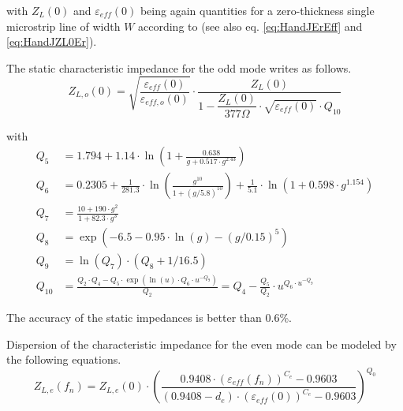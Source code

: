 \documentclass[10pt]{report}
\begin{document}
with $Z_L(0)$ and $\varepsilon_{eff}(0)$ being again quantities for a
zero-thickness single microstrip line of width $W$ according to
\cite{Hammerstad} (see also eq. \eqref{eq:HandJErEff} and
\eqref{eq:HandJZL0Er}).

\addvspace{12pt}

The static characteristic impedance for the odd mode writes as follows.
\begin{equation}
Z_{L,o}(0) = \sqrt{\dfrac{\varepsilon_{eff}(0)}{\varepsilon_{eff,o}(0)}} \cdot
             \dfrac{Z_L(0)}{1 - \dfrac{Z_L(0)}{377\Omega} \cdot \sqrt{\varepsilon_{eff}(0)} \cdot Q_{10}}
\end{equation}

with
\begin{align}
Q_5 &= 1.794 +1.14\cdot\ln\left( 1 + \frac{0.638}{g+0.517\cdot g^{2.43}} \right)\\
Q_6 &= 0.2305 + \frac{1}{281.3}\cdot \ln\left( \frac{g^{10}}{1+\left( g/5.8\right) ^{10}} \right)
     + \frac{1}{5.1}\cdot \ln\left(1+0.598\cdot g^{1.154}\right)\\
Q_7 &= \frac{10+190\cdot g^2}{1+82.3\cdot g^3}\\
Q_8 &= \exp\left( -6.5 - 0.95\cdot\ln\left(g\right) - \left(g/0.15\right)^5 \right)\\
Q_9 &= \ln\left(Q_7\right)\cdot \left( Q_8 + 1/16.5 \right)\\
Q_{10} &= \frac{Q_2\cdot Q_4 - Q_5\cdot\exp\left( \ln\left(u\right)\cdot Q_6\cdot u^{-Q_9} \right)}{Q_2}
       = Q_4 - \frac{Q_5}{Q_2}\cdot u^{Q_6\cdot u^{-Q_9}}
\end{align}

The accuracy of the static impedances is better than 0.6\%.

\addvspace{12pt}

Dispersion of the characteristic impedance for the even mode can be
modeled by the following equations.
\begin{equation}
Z_{L,e}(f_n) = Z_{L,e}(0)\cdot \left( \dfrac{0.9408\cdot (\varepsilon_{eff}(f_n))^{C_e} - 0.9603}
                        {\left(0.9408-d_e\right)\cdot \left(\varepsilon_{eff}(0)\right)^{C_e} - 0.9603} \right) ^{Q_0}
\end{equation}
\end{document}
